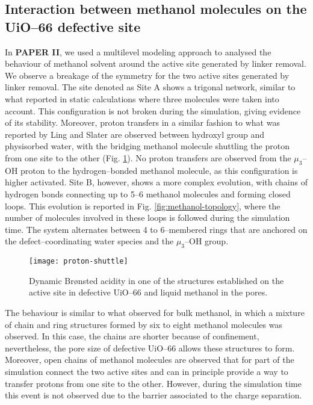 \subsection*{Interaction between methanol molecules on the UiO--66 defective site}
In \textbf{PAPER II}, we used a multilevel modeling approach to analysed the behaviour of methanol solvent around the active site generated by linker removal. We observe a breakage of the symmetry for the two active sites generated by linker removal. The site denoted as Site A shows a trigonal network, similar to what reported in static calculations where three molecules were taken into account. This configuration is not broken during the simulation, giving evidence of its stability. Moreover, proton transfers in a similar fashion to what was reported by Ling and Slater \cite{ling2016dynamic} are observed between hydroxyl group and physisorbed water, with the bridging methanol molecule shuttling the proton from one site to the other (Fig. \ref{fig:proton-shuttle}). No proton transfers are observed from the $\mu_3$--OH proton to the hydrogen--bonded methanol molecule, as this configuration is higher activated. Site B, however, shows a more complex evolution, with chains of hydrogen bonds connecting up to 5--6 methanol molecules and forming closed loops. This evolution is reported in Fig. \ref{fig:methanol-topology}, where the number of molecules involved in these loops is followed during the simulation time. The system alternates between 4 to 6--membered rings that are anchored on the defect--coordinating water species and the $\mu_3$--OH group. 
\begin{figure}[!htbp]
	\centering
	\texttt{[image: proton-shuttle]}
	\caption{Dynamic Br\o{}nsted acidity in one of the structures established on the active site in defective UiO--66 and liquid methanol in the pores.}
	\label{fig:proton-shuttle}
\end{figure}

\npar
The behaviour is similar to what observed for bulk methanol\cite{kashtanov2005chemical, pagliai2003hydrogen, morrone2002ab}, in which a mixture of chain and ring structures formed by six to eight methanol molecules was observed. In this case, the chains are shorter because of confinement, nevertheless, the pore size of defective UiO--66 allows these structures to form. Moreover, open chains of methanol molecules are observed that for part of the simulation connect the two active sites and can in principle provide a way to transfer protons from one site to the other. However, during the simulation time this event is not observed due to the barrier associated to the charge separation. 

